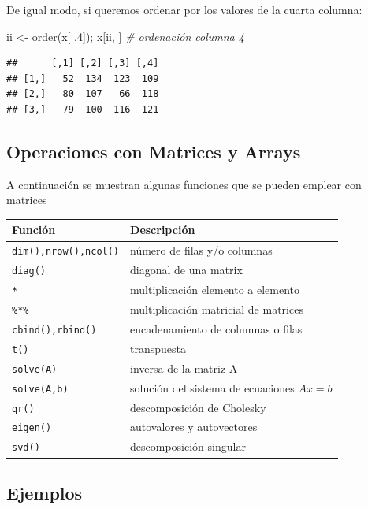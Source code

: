 \documentclass[
]{book}
\newenvironment{Shaded}{\begin{snugshade}}{\end{snugshade}}
\newcommand{\CommentTok}[1]{\textcolor[rgb]{0.56,0.35,0.01}{\textit{#1}}}
\newcommand{\DecValTok}[1]{\textcolor[rgb]{0.00,0.00,0.81}{#1}}
\newcommand{\FunctionTok}[1]{\textcolor[rgb]{0.00,0.00,0.00}{#1}}
\newcommand{\NormalTok}[1]{#1}
\newcommand{\OtherTok}[1]{\textcolor[rgb]{0.56,0.35,0.01}{#1}}
\theoremstyle{break}
\begin{document}
De igual modo, si queremos ordenar por los valores de la cuarta columna:

\begin{Shaded}
\begin{Highlighting}[]
\NormalTok{ii }\OtherTok{\textless{}{-}} \FunctionTok{order}\NormalTok{(x[ ,}\DecValTok{4}\NormalTok{]); x[ii, ]  }\CommentTok{\# ordenación columna 4}
\end{Highlighting}
\end{Shaded}

\begin{verbatim}
##      [,1] [,2] [,3] [,4]
## [1,]   52  134  123  109
## [2,]   80  107   66  118
## [3,]   79  100  116  121
\end{verbatim}

\hypertarget{operaciones-con-matrices-y-arrays}{%
\subsection{Operaciones con Matrices y Arrays}\label{operaciones-con-matrices-y-arrays}}

A continuación se muestran algunas funciones que se pueden emplear con
matrices

\begin{longtable}[]{@{}ll@{}}
\toprule
Función & Descripción \\
\midrule
\endhead
\texttt{dim(),nrow(),ncol()} & número de filas y/o columnas \\
\texttt{diag()} & diagonal de una matrix \\
\texttt{*} & multiplicación elemento a elemento \\
\texttt{\%*\%} & multiplicación matricial de matrices \\
\texttt{cbind(),rbind()} & encadenamiento de columnas o filas \\
\texttt{t()} & transpuesta \\
\texttt{solve(A)} & inversa de la matriz A \\
\texttt{solve(A,b)} & solución del sistema de ecuaciones \(Ax=b\) \\
\texttt{qr()} & descomposición de Cholesky \\
\texttt{eigen()} & autovalores y autovectores \\
\texttt{svd()} & descomposición singular \\
\bottomrule
\end{longtable}

\hypertarget{ejemplos}{%
\subsection{Ejemplos}\label{ejemplos}}
\end{document}
